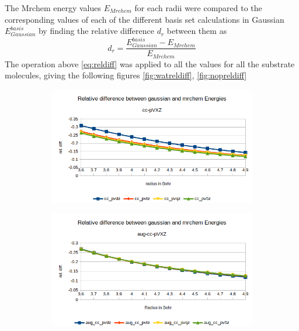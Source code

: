 \documentclass[../master_thesis.tex]{subfiles}
\begin{document}
The Mrchem energy values $E_{Mrchem}$ for each radii were compared to the
corresponding values of each of the different basis set calculations in
Gaussian  $E_{Gaussian}^{basis}$ by finding the relative difference $d_r$
between them as
\begin{equation}\label{eq:reldiff}
  d_r = \frac{E_{Gaussian}^{basis} - E_{Mrchem}}{E_{Mrchem}}
\end{equation}
The operation above \ref{eq:reldiff} was applied to all the values for all the
substrate molecules, giving the following figures \ref{fig:watreldiff},
\ref{fig:nopreldiff} %

\begin{figure}[h!]
  \centering
  \begin{subfigure}[b]{\linewidth}
    \includegraphics[width=\linewidth]{img/watreldiff.png}
  \end{subfigure}
  \begin{subfigure}[b]{\linewidth}
    \includegraphics[width=\linewidth]{img/wataugreldiff.png}
  \end{subfigure}
  \begin{subfigure}[b]{\linewidth}

\end{subfigure}
\end{figure}
\end{document}
